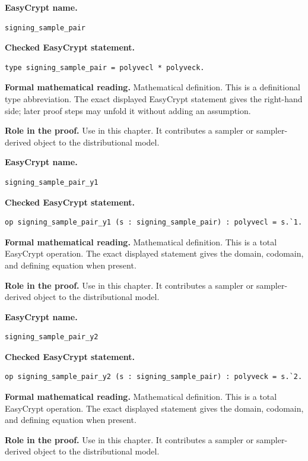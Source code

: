 \begin{formaldefinition}
\noindent\textbf{EasyCrypt name.}
\begin{lstlisting}[language=EasyCrypt,basicstyle=\ttfamily\scriptsize]
signing_sample_pair
\end{lstlisting}
\noindent\textbf{Checked EasyCrypt statement.}
\begin{lstlisting}[language=EasyCrypt,basicstyle=\ttfamily\scriptsize]
type signing_sample_pair = polyvecl * polyveck.
\end{lstlisting}
\noindent\textbf{Formal mathematical reading.}
Mathematical definition. This is a definitional type abbreviation.  The exact displayed EasyCrypt statement gives the right-hand side; later proof steps may unfold it without adding an assumption.

\noindent\textbf{Role in the proof.}
Use in this chapter. It contributes a sampler or sampler-derived object to the distributional model.

\end{formaldefinition}

\begin{formaldefinition}
\noindent\textbf{EasyCrypt name.}
\begin{lstlisting}[language=EasyCrypt,basicstyle=\ttfamily\scriptsize]
signing_sample_pair_y1
\end{lstlisting}
\noindent\textbf{Checked EasyCrypt statement.}
\begin{lstlisting}[language=EasyCrypt,basicstyle=\ttfamily\scriptsize]
op signing_sample_pair_y1 (s : signing_sample_pair) : polyvecl = s.`1.
\end{lstlisting}
\noindent\textbf{Formal mathematical reading.}
Mathematical definition. This is a total EasyCrypt operation.  The exact displayed statement gives the domain, codomain, and defining equation when present.

\noindent\textbf{Role in the proof.}
Use in this chapter. It contributes a sampler or sampler-derived object to the distributional model.

\end{formaldefinition}

\begin{formaldefinition}
\noindent\textbf{EasyCrypt name.}
\begin{lstlisting}[language=EasyCrypt,basicstyle=\ttfamily\scriptsize]
signing_sample_pair_y2
\end{lstlisting}
\noindent\textbf{Checked EasyCrypt statement.}
\begin{lstlisting}[language=EasyCrypt,basicstyle=\ttfamily\scriptsize]
op signing_sample_pair_y2 (s : signing_sample_pair) : polyveck = s.`2.
\end{lstlisting}
\noindent\textbf{Formal mathematical reading.}
Mathematical definition. This is a total EasyCrypt operation.  The exact displayed statement gives the domain, codomain, and defining equation when present.

\noindent\textbf{Role in the proof.}
Use in this chapter. It contributes a sampler or sampler-derived object to the distributional model.

\end{formaldefinition}

